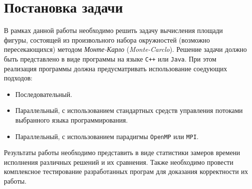 \section{Постановка задачи}

В рамках данной работы необходимо решить задачу вычисления площади фигуры, состоящей из произвольного набора окружностей
(возможно пересекающихся) методом \emph{Монте-Карло} (\emph{Monte-Carclo}). Решение задачи должно быть представлено в виде программы на 
языке \texttt{C++} или \texttt{Java}. При этом реализация программы должна предусматривать использование соедующих подходов:
\begin{itemize}
    \item Последовательный.
    \item Параллельный, с использованием стандартных средств управления потоками выбранного языка программирования.
    \item Параллельный, с использованием парадигмы \texttt{OpenMP} или \texttt{MPI}.
\end{itemize}

Результаты работы необходимо представить в виде статистики замеров времени исполнения различных решений и их сравнения. Также 
необходимо провести комплексное тестирование разработанных програм для доказания корректности их работы.